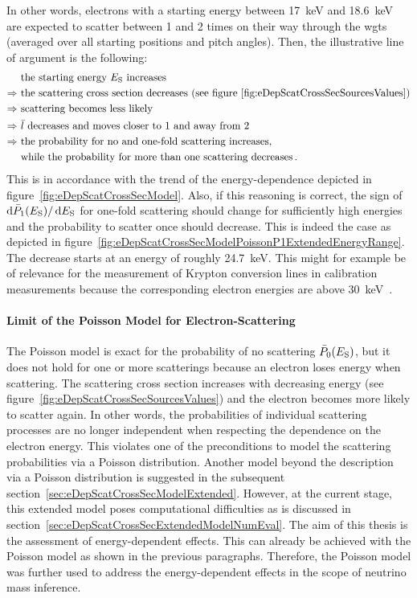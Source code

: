 In other words, electrons with a starting energy between \SI{17}{keV} and \SI{18.6}{keV} are expected to scatter between 1 and 2 times on their way through the \gls{wgts} (averaged over all starting positions and pitch angles). Then, the illustrative line of argument is the following: 
\begin{align*}
	&\text{ the starting energy $E_\mathrm{S}$ increases} \\ \Rightarrow
	&\text{ the scattering cross section decreases (see figure~\ref{fig:eDepScatCrossSecSourcesValues})} \\ \Rightarrow
	&\text{ scattering becomes less likely} \\ \Rightarrow
	&\text{ $\bar{l}$ decreases and moves closer to 1 and away from 2} \\ \Rightarrow
	&\text{ the probability for no and one-fold scattering increases,} \\
	&\text{ while the probability for more than one scattering decreases}
	\text{\,.}
\end{align*} 
This is in accordance with the trend of the energy-dependence depicted in figure~\ref{fig:eDepScatCrossSecModel}. Also, if this reasoning is correct, the sign of $\mathop{}\!\mathrm{d} \bar{P}_1(E_\mathrm{S}) / \mathop{}\!\mathrm{d} E_\mathrm{S}$ for one-fold scattering should change for sufficiently high energies and the probability to scatter once should decrease. This is indeed the case as depicted in figure~\ref{fig:eDepScatCrossSecModelPoissonP1ExtendedEnergyRange}. The decrease starts at an energy of roughly \SI{24.7}{keV}. This might for example be of relevance for the measurement of Krypton conversion lines in calibration measurements because the corresponding electron energies are above \SI{30}{keV}~\cite{venos2018}.


\paragraph{Limit of the Poisson Model for Electron-Scattering}
The Poisson model is exact for the probability of no scattering $\bar{P}_0(E_\mathrm{S})$, but it does not hold for one or more scatterings because an electron loses energy when scattering. The scattering cross section increases with decreasing energy (see figure~\ref{fig:eDepScatCrossSecSourcesValues}) and the electron becomes more likely to scatter again. In other words, the probabilities of individual scattering processes are no longer independent when respecting the dependence on the electron energy. This violates one of the preconditions to model the scattering probabilities via a Poisson distribution. Another model beyond the description via a Poisson distribution is suggested in the subsequent section~\ref{sec:eDepScatCrossSecModelExtended}. However, at the current stage, this extended model poses computational difficulties as is discussed in section~\ref{sec:eDepScatCrossSecExtendedModelNumEval}. The aim of this thesis is the assessment of energy-dependent effects. This can already be achieved with the Poisson model as shown in the previous paragraphs. Therefore, the Poisson model was further used to address the energy-dependent effects in the scope of neutrino mass inference.
\FloatBarrier


